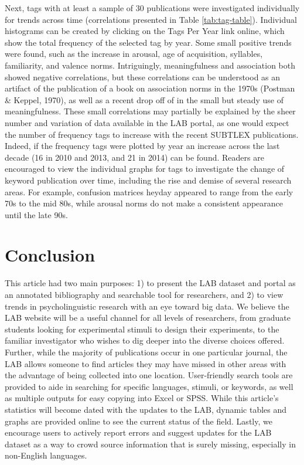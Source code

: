 \documentclass[english,man]{apa6}
\theoremstyle{definition}
\theoremstyle{definition}
\theoremstyle{definition}
\theoremstyle{remark}
\begin{document}
Next, tags with at least a sample of 30 publications were investigated
individually for trends across time (correlations presented in Table
\ref{tab:tag-table}). Individual histograms can be created by clicking
on the Tags Per Year link online, which show the total frequency of the
selected tag by year. Some small positive trends were found, such as the
increase in arousal, age of acquisition, syllables, familiarity, and
valence norms. Intriguingly, meaningfulness and association both showed
negative correlations, but these correlations can be understood as an
artifact of the publication of a book on association norms in the 1970s
(Postman \& Keppel, 1970), as well as a recent drop off of in the small
but steady use of meaningfulness. These small correlations may partially
be explained by the sheer number and variation of data available in the
LAB portal, as one would expect the number of frequency tags to increase
with the recent SUBTLEX publications. Indeed, if the frequency tags were
plotted by year an increase across the last decade (16 in 2010 and 2013,
and 21 in 2014) can be found. Readers are encouraged to view the
individual graphs for tags to investigate the change of keyword
publication over time, including the rise and demise of several research
areas. For example, confusion matrices heyday appeared to range from the
early 70s to the mid 80s, while arousal norms do not make a consistent
appearance until the late 90s.

\section{Conclusion}\label{conclusion}

This article had two main purposes: 1) to present the LAB dataset and
portal as an annotated bibliography and searchable tool for researchers,
and 2) to view trends in psycholinguistic research with an eye toward
big data. We believe the LAB website will be a useful channel for all
levels of researchers, from graduate students looking for experimental
stimuli to design their experiments, to the familiar investigator who
wishes to dig deeper into the diverse choices offered. Further, while
the majority of publications occur in one particular journal, the LAB
allows someone to find articles they may have missed in other areas with
the advantage of being collected into one location. User-friendly search
tools are provided to aide in searching for specific languages, stimuli,
or keywords, as well as multiple outputs for easy copying into Excel or
SPSS. While this article's statistics will become dated with the updates
to the LAB, dynamic tables and graphs are provided online to see the
current status of the field. Lastly, we encourage users to actively
report errors and suggest updates for the LAB dataset as a way to crowd
source information that is surely missing, especially in non-English
languages.
\end{document}
